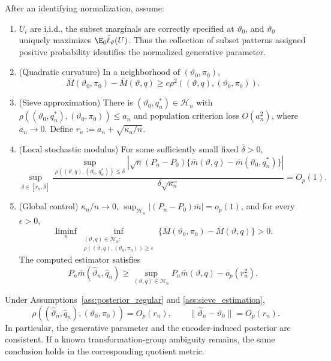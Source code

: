 \begin{assumption}
\label{ass:sieve_estimation}
After an identifying normalization, assume:
\begin{enumerate}
\item[(i)] $U_i$ are i.i.d., the subset marginals are correctly specified at
$\vartheta_0$, and $\vartheta_0$ uniquely maximizes
$\E_0\bar\ell_\vartheta(U)$.  Thus the collection of subset patterns assigned
positive probability identifies the normalized generative parameter.
\item[(ii)] (Quadratic curvature) In a neighborhood of
$(\vartheta_0,\pi_0)$,
\[
 \bar M(\vartheta_0,\pi_0)-\bar M(\vartheta,q)
 \ge c\rho^2((\vartheta,q),(\vartheta_0,\pi_0)).
\]
\item[(iii)] (Sieve approximation) There is
$(\vartheta_0,q_n^*)\in\mathcal H_n$ with
$\rho((\vartheta_0,q_n^*),(\vartheta_0,\pi_0))\le a_n$ and population
criterion loss $O(a_n^2)$, where $a_n\to0$.
Define $r_n:=a_n+\sqrt{\kappa_n/n}$.
\item[(iv)] (Local stochastic modulus) For some sufficiently small fixed
$\bar\delta>0$,
\[
 \sup_{\delta\in[r_n,\bar\delta]}
 \frac{
 \sup_{\rho((\vartheta,q),(\vartheta_0,q_n^*))\le\delta}
 \left|\sqrt n(P_n-P_0)
 \{\bar m(\vartheta,q)-\bar m(\vartheta_0,q_n^*)\}\right|}
 {\delta\sqrt{\kappa_n}}=O_p(1).
\]
\item[(v)] (Global control) $\kappa_n/n\to0$,
$\sup_{\mathcal H_n}|(P_n-P_0)\bar m|=o_p(1)$, and for every
$\epsilon>0$,
\[
 \liminf_n\inf_{\substack{(\vartheta,q)\in\mathcal H_n:\\
 \rho((\vartheta,q),(\vartheta_0,\pi_0))\ge\epsilon}}
 \{\bar M(\vartheta_0,\pi_0)-\bar M(\vartheta,q)\}>0.
\]
The computed estimator satisfies
\[
 P_n\bar m(\widehat\vartheta_n,\widehat q_n)
 \ge\sup_{(\vartheta,q)\in\mathcal H_n}P_n\bar m(\vartheta,q)-o_p(r_n^2).
\]
\end{enumerate}
\end{assumption}

\begin{theorem}
\label{thm:sieve_consistency_rate}
Under Assumptions~\ref{ass:posterior_regular} and
\ref{ass:sieve_estimation},
\[
 \rho((\widehat\vartheta_n,\widehat q_n),
 (\vartheta_0,\pi_0))=O_p(r_n),
 \qquad
 \|\widehat\vartheta_n-\vartheta_0\|=O_p(r_n).
\]
In particular, the generative parameter and the encoder-induced posterior are
consistent.  If a known transformation-group ambiguity remains, the same
conclusion holds in the corresponding quotient metric.
\end{theorem}

